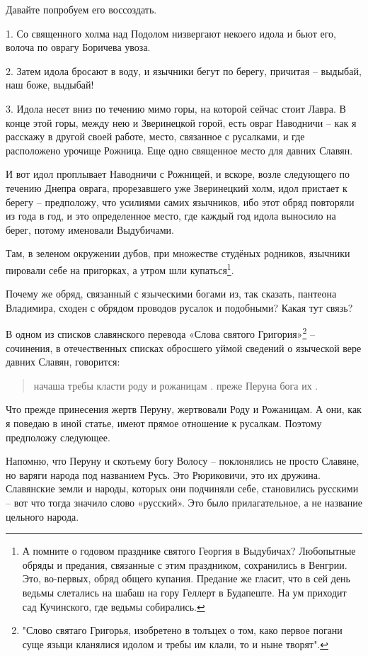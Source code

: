 \documentclass[a5paper,11pt,openany]{article}
\begin{document}
   Давайте попробуем его воссоздать.

1. Со священного холма над Подолом  низвергают некоего идола и бьют его, волоча по оврагу Боричева увоза. 

2. Затем идола бросают в воду, и язычники бегут по берегу, причитая – выдыбай, наш боже, выдыбай!

3. Идола несет вниз по течению мимо горы, на которой сейчас стоит Лавра. В конце этой горы, между нею и Зверинецкой горой, есть овраг Наводничи – как я расскажу в другой своей работе, место, связанное с русалками, и где расположено урочище Рожница. Еще одно священное место для давних Славян.

   И вот идол проплывает Наводничи с Рожницей, и вскоре, возле следующего по течению Днепра оврага, прорезавшего уже Зверинецкий холм, идол пристает к берегу – предположу, что усилиями самих язычников, ибо этот обряд повторяли из года в год, и это определенное место, где каждый год идола выносило на берег, потому именовали Выдубичами. 

   Там, в зеленом окружении дубов, при множестве студёных родников, язычники пировали себе на пригорках, а утром шли купаться\footnote{А помните о годовом празднике святого Георгия в Выдубичах? Любопытные обряды и предания, связанные с этим праздником, сохранились в Венгрии. Это, во-первых, обряд общего купания. Предание же гласит, что в сей день ведьмы слетались на шабаш на гору Геллерт в Будапеште. На ум приходит сад Кучинского, где ведьмы собирались.}.

   Почему же обряд, связанный с языческими богами из, так сказать, пантеона Владимира, сходен с обрядом проводов русалок и подобными? Какая тут связь?

   В одном из списков славянского перевода «Слова святого Григория»\footnote{"Слово святаго Григорья, изобретено в толъцех о том, како первое погани суще языци кланялися идолом и требы им клали, то и ныне творят".} – сочинения, в отечественных списках обросшего уймой сведений о языческой вере давних Славян, говорится:

\begin{quotation}
\noindent начаша требы класти роду и рожаницам . преже Перуна бога их .
\end{quotation}

   Что прежде принесения жертв Перуну, жертвовали Роду и Рожаницам. А они, как я поведаю в иной статье, имеют прямое отношение к русалкам. Поэтому предположу следующее.

   Напомню, что Перуну и скотьему богу Волосу – поклонялись не просто Славяне, но варяги народа под названием Русь. Это Рюриковичи, это их дружина. Славянские земли и народы, которых они подчиняли себе, становились русскими – вот что тогда значило слово «русский». Это было прилагательное, а не название цельного народа.
\end{document}
